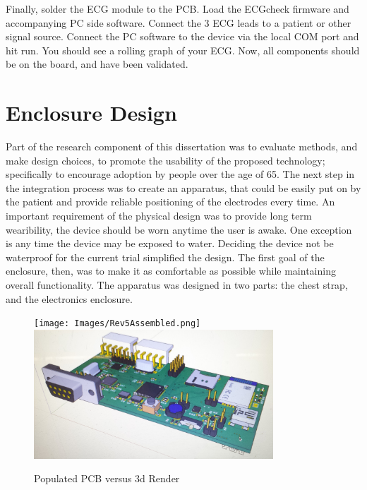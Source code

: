 Finally, solder the ECG module to the PCB. Load the ECGcheck firmware and accompanying PC side software. Connect the 3 ECG leads to a patient or other signal source. Connect the PC software to the device via the local COM port and hit run. You should see a rolling graph of your ECG. Now, all components should be on the board, and have been validated.


\section {Enclosure Design}
\label{sec:EnclosureDesign}
Part of the research component of this dissertation was to evaluate methods, and make design choices, to promote the usability of the  proposed technology; specifically to encourage adoption by people over the age of 65. The next step in the integration process was to create an apparatus, that could be easily put on by the patient and provide reliable positioning of the electrodes every time. An important requirement of the physical design was to provide long term wearibility, the device should be worn anytime the user is awake. One exception is any time the device may be exposed to water. Deciding the device not be waterproof for the current trial simplified the design. The first goal of the enclosure, then, was to make it as comfortable as possible while maintaining overall functionality. The apparatus was designed in two parts: the chest strap, and the electronics enclosure.


\begin{figure}
 \begin{center}
  \label{fig:PCBvsRender}
  \texttt{[image: Images/Rev5Assembled.png]} 
  \includegraphics[scale=1,width=0.8\textwidth]{Images/Rev5_prerender.png} 
  \caption{Populated PCB versus 3d Render}
 
 \end{center}
\end{figure}

